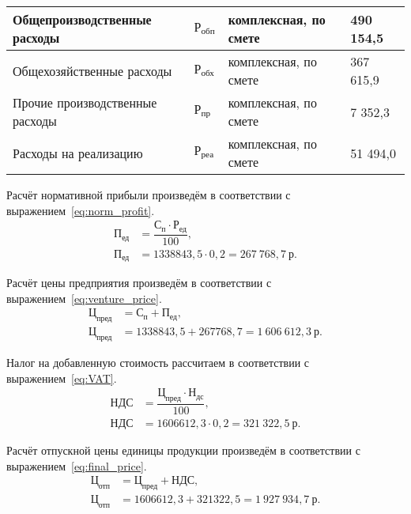 \begin{table}[h!]
{\begin{tabular}{| p{} | p{} |
                      p{} | p{} |}
      Общепроизводственные \newline расходы & $ \text{Р}_{\text{обп}} $ &
      комплексная, по смете &
      490 154,5 \\ \hline

      Общехозяйственные расходы & $ \text{Р}_{\text{обх}} $ &
      комплексная, по смете &
      367 615,9 \\ \hline

      Прочие производственные \newline расходы & $ \text{Р}_{\text{пр}} $ &
      комплексная, по смете &
      7 352,3 \\ \hline

      Расходы на реализацию & $ \text{Р}_{\text{реа}} $ &
      комплексная, по смете &
      51 494,0 \\ \hline

    \end{tabular}
  }
\end{table}

\newpage

Расчёт нормативной прибыли произведём в соответствии с
выражением~\ref{eq:norm_profit}.
\begin{align}
  \label{eq:norm_profit}
  \text{П}_{\text{ед}} &= \dfrac{\text{С}_{\text{п}} \cdot
    \text{Р}_{\text{ед}}}{100}, \\
  \text{П}_{\text{ед}} &= 1338843{,}5 \cdot 0{,}2 =
    267~768{,}7 \: \text{р.} \nonumber
\end{align}

Расчёт цены предприятия произведём в соответствии с
выражением~\ref{eq:venture_price}.
\begin{align}
  \label{eq:venture_price}
  \text{Ц}_{\text{пред}} &= \text{С}_{\text{п}} + \text{П}_{\text{ед}}, \\
  \text{Ц}_{\text{пред}} &= 1338843{,}5 + 267768{,}7 =
    1~606~612{,}3 \: \text{р.} \nonumber
\end{align}

Налог на добавленную стоимость рассчитаем в соответствии с
выражением~\ref{eq:VAT}.
\begin{align}
  \label{eq:VAT}
  \text{НДС} &= \dfrac{\text{Ц}_{\text{пред}} \cdot \text{Н}_{\text{дс}}}{100}, \\
  \text{НДС} &= 1606612{,}3 \cdot 0{,}2 = 321~322{,}5 \: \text{р.} \nonumber
\end{align}

Расчёт отпускной цены единицы продукции произведём в соответствии с
выражением~\ref{eq:final_price}.
\begin{align}
  \label{eq:final_price}
  \text{Ц}_{\text{отп}} &= \text{Ц}_{\text{пред}} + \text{НДС}, \\
  \text{Ц}_{\text{отп}} &= 1606612{,}3 + 321322{,}5 =
    1~927~934{,}7 \: \text{р.} \nonumber
\end{align}
